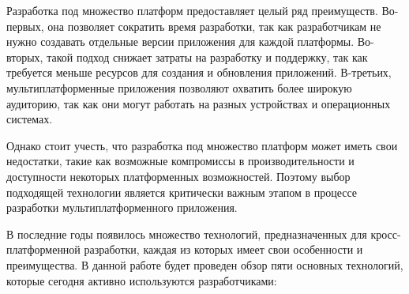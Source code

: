\documentclass[14pt, russian]{scrartcl}
\begin{document}
Разработка под множество платформ предоставляет целый ряд преимуществ. Во-первых, она позволяет сократить время разработки, так как разработчикам не нужно создавать отдельные версии приложения для каждой платформы. Во-вторых, такой подход снижает затраты на разработку и поддержку, так как требуется меньше ресурсов для создания и обновления приложений. В-третьих, мультиплатформенные приложения позволяют охватить более широкую аудиторию, так как они могут работать на разных устройствах и операционных системах.

Однако стоит учесть, что разработка под множество платформ может иметь свои недостатки, такие как возможные компромиссы в производительности и доступности некоторых платформенных возможностей. Поэтому выбор подходящей технологии является критически важным этапом в процессе разработки мультиплатформенного приложения.

В последние годы появилось множество технологий, предназначенных для кросс-платформенной разработки, каждая из которых имеет свои особенности и преимущества. В данной работе будет проведен обзор пяти основных технологий, которые сегодня активно используются разработчиками:
\end{document}
